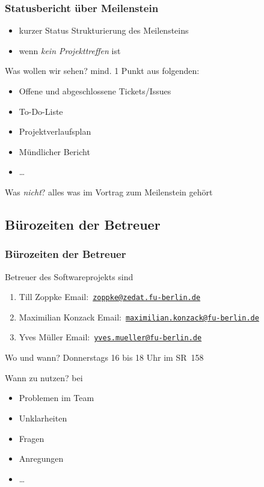 \documentclass[ucs,9pt]{beamer}
\newcommand{\email}[1]{\href{mailto:#1}{\texttt{#1}}}
\begin{document}
\begin{frame}
    \frametitle{Statusbericht über Meilenstein}
    \begin{itemize}
        \item kurzer Status Strukturierung des Meilensteins
        \item wenn \emph{kein Projekttreffen} ist
    \end{itemize}
        \begin{block}{Was wollen wir sehen?}
            mind. 1 Punkt aus folgenden:
            \begin{itemize}
                \item Offene und abgeschlossene Tickets/Issues
                \item To-Do-Liste
                \item Projektverlaufsplan
                \item Mündlicher Bericht
                \item \dots
            \end{itemize}
        \end{block}
        \begin{block}{Was \emph{nicht}?}
            alles was im Vortrag zum Meilenstein gehört
        \end{block}
\end{frame}

\subsection{Bürozeiten der Betreuer}
\begin{frame}
    \frametitle{Bürozeiten der Betreuer}
    Betreuer des Softwareprojekts sind
    \begin{enumerate}
        \item Till Zoppke Email:~\email{zoppke@zedat.fu-berlin.de}
        \item Maximilian Konzack Email:~\email{maximilian.konzack@fu-berlin.de}
        \item Yves Müller Email:~\email{yves.mueller@fu-berlin.de}
    \end{enumerate}
    \begin{block}{Wo und wann?}
        Donnerstags 16 bis 18 Uhr im SR~158
    \end{block}
    \begin{block}{Wann zu nutzen?}
        bei
        \begin{itemize}
            \item Problemen im Team
            \item Unklarheiten
            \item Fragen
            \item Anregungen
            \item \dots
        \end{itemize}
    \end{block}
\end{frame}
\end{document}
